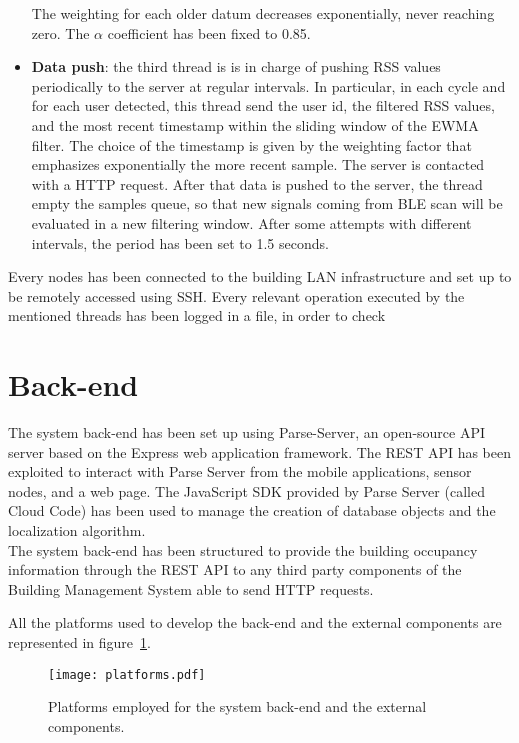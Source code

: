 \begin{itemize}
The weighting for each older datum decreases exponentially, never reaching zero. The $\alpha$ coefficient has been fixed to 0.85.
\item \textbf{Data push}: the third thread is is in charge of pushing RSS values periodically to the server at regular intervals. In particular, in each cycle and for each user detected, this thread send the user id, the filtered RSS values, and the most recent timestamp within the sliding window of the EWMA filter.
The choice of the timestamp is given by the weighting factor that emphasizes exponentially the more recent sample. The server is contacted with a HTTP request.
After that data is pushed to the server, the thread empty the samples queue, so that new signals coming from BLE scan will be evaluated in a new filtering window.
After some attempts with different intervals, the period has been set to 1.5 seconds.
\end{itemize}

Every nodes has been connected to the building LAN infrastructure and set up to be remotely accessed using SSH. Every relevant operation executed by the mentioned threads has been logged in a file, in order to check 

\section{Back-end}
\label{sec:back-end}
The system back-end has been set up using Parse-Server, an open-source API server based on the Express web application framework. The REST API has been exploited to interact with Parse Server from the mobile applications, sensor nodes, and a web page. The JavaScript SDK provided by Parse Server (called Cloud Code) has been used to manage the creation of database objects and the localization algorithm.\\
The system back-end has been structured to provide the building occupancy information through the REST API to any third party components of the Building Management System able to send HTTP requests.

All the platforms used to develop the back-end and the external components are represented in figure~\ref{fig:platforms}.

\begin{figure}[h!tb]
\centering
\texttt{[image: platforms.pdf]}
\caption[Platforms employed for the system back-end and the external components.]{Platforms employed for the system back-end and the external components.}
\label{fig:platforms}
\end{figure}

